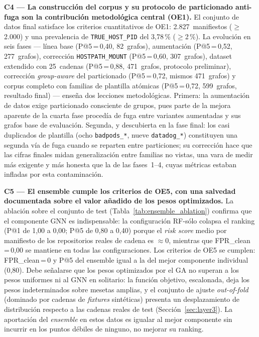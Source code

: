 \textbf{C4 — La construcción del corpus y su protocolo de particionado
anti-fuga son la contribución metodológica central (OE1).} El conjunto de datos
final satisface los criterios cuantitativos de OE1: 2.827~manifiestos
(\(\geq\)2.000) y una prevalencia de \texttt{TRUE\_HOST\_PID} del 3,78\,\%
(\(\geq\)2\,\%). La evolución en seis fases — línea base (P@5\,=\,0,40,
82~grafos), aumentación (P@5\,=\,0,52, 277~grafos), corrección
\texttt{HOSTPATH\_MOUNT} (P@5\,=\,0,60, 307~grafos), dataset extendido con
25~cadenas (P@5\,=\,0,88, 471~grafos, protocolo preliminar), corrección
\textit{group-aware} del particionado (P@5\,=\,0,72, mismos 471~grafos) y
corpus completo con familias de plantilla atómicas (P@5\,=\,0,72, 599~grafos,
resultado final) — enseña dos lecciones metodológicas. Primera: la aumentación
de datos exige particionado consciente de grupos, pues parte de la mejora
aparente de la cuarta fase procedía de fuga entre variantes aumentadas y sus
grafos base de evaluación. Segunda, y descubierta en la fase final: los casi
duplicados de plantilla (ocho \texttt{badpods\_*}, nueve \texttt{datadog\_*})
constituyen una segunda vía de fuga cuando se reparten entre particiones; su
corrección hace que las cifras finales midan generalización entre familias no
vistas, una vara de medir más exigente y más honesta que la de las fases~1--4,
cuyas métricas estaban infladas por esta contaminación.

\textbf{C5 — El ensemble cumple los criterios de OE5, con una salvedad
documentada sobre el valor añadido de los pesos optimizados.} La ablación sobre
el conjunto de test (Tabla~\ref{tab:ensemble_ablation}) confirma que el
componente \ac{GNN} es indispensable: la configuración RF-sólo colapsa el
ranking (P@1 de 1,00 a 0,00; P@5 de 0,80 a 0,40) porque el \textit{risk score}
medio por manifiesto de los repositorios reales de cadena es \(\approx\)0,
mientras que \ac{FPR}\_clean\,=\,0,00 se mantiene en todas las configuraciones.
Los criterios de OE5 se cumplen: \ac{FPR}\_clean\,=\,0 y P@5 del ensemble igual
a la del mejor componente individual (0,80). Debe señalarse que los pesos
optimizados por el \ac{GA} no superan a los pesos uniformes ni al \ac{GNN} en
solitario: la función objetivo, escalonada, deja los pesos indeterminados sobre
mesetas amplias, y el conjunto de ajuste \textit{out-of-fold} (dominado por
cadenas de \textit{fixtures} sintéticas) presenta un desplazamiento de
distribución respecto a las cadenas reales de test
(Sección~\ref{sec:layer3}). La aportación del \textit{ensemble} en estos datos
es igualar al mejor componente sin incurrir en los puntos débiles de ninguno,
no mejorar su ranking.

